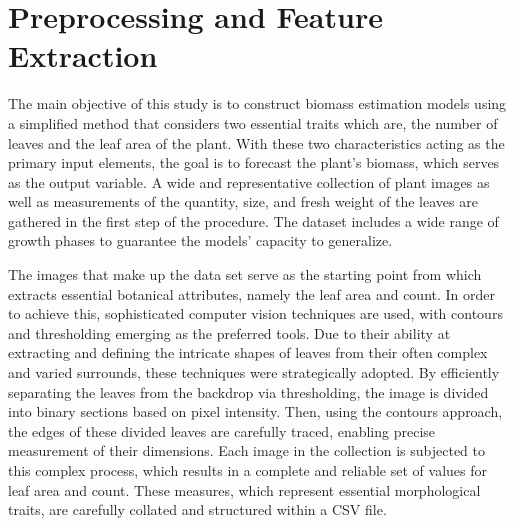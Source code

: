 \documentclass[a4paper,11pt]{report}%
\renewcommand{\\}{\vspace*{0.5\baselineskip} \newline}
\begin{document}
\section{Preprocessing and  Feature Extraction}
The main objective of this study is to construct biomass estimation models using a simplified method that considers two essential traits which are, the number of leaves and the leaf area of the plant. With these two characteristics acting as the primary input elements, the goal is to forecast the plant's biomass, which serves as the output variable. A wide and representative collection of plant images as well as measurements of the quantity, size, and fresh weight of the leaves are gathered in the first step of the procedure. The dataset includes a wide range of growth phases to guarantee the models' capacity to generalize.




\noindent The images that make up the data set serve as the starting point from which extracts essential botanical attributes, namely the leaf area and count. In order to achieve this, sophisticated computer vision techniques are used, with contours and thresholding emerging as the preferred tools. Due to their ability at extracting and defining the intricate shapes of leaves from their often complex and varied surrounds, these techniques were strategically adopted. By efficiently separating the leaves from the backdrop via thresholding, the image is divided into binary sections based on pixel intensity. Then, using the contours approach, the edges of these divided leaves are carefully traced, enabling precise measurement of their dimensions.
Each image in the collection is subjected to this complex process, which results in a complete and reliable set of values for leaf area and count. These measures, which represent essential morphological traits, are carefully collated and structured within a CSV file.
\end{document}
